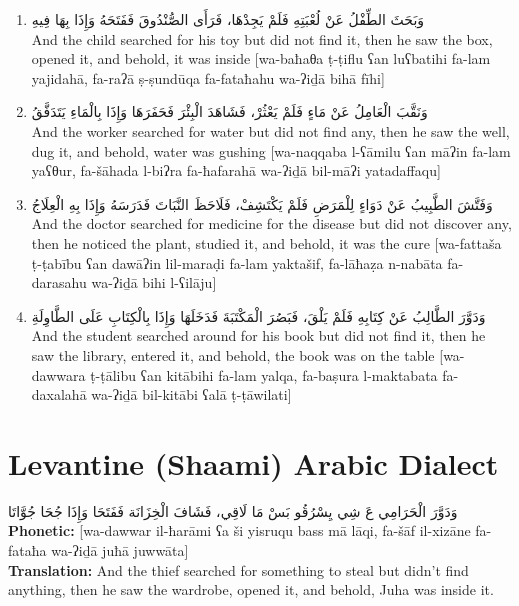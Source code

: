 \documentclass[letter,12pt]{article}
\begin{document}
\begin{enumerate}
\item \textarabic{وَبَحَثَ الطِّفْلُ عَنْ لُعْبَتِهِ فَلَمْ يَجِدْهَا، فَرَأَى الصُّنْدُوقَ فَفَتَحَهُ وَإِذَا بِهَا فِيهِ}\\
And the child searched for his toy but did not find it, then he saw the box, opened it, and behold, it was inside [wa-baħaθa ṭ-ṭiflu ʕan luʕbatihi fa-lam yajidahā, fa-raʔā ṣ-ṣundūqa fa-fataħahu wa-ʔiḏā bihā fīhi]

\item \textarabic{وَنَقَّبَ الْعَامِلُ عَنْ مَاءٍ فَلَمْ يَعْثُرْ، فَشَاهَدَ الْبِئْرَ فَحَفَرَهَا وَإِذَا بِالْمَاءِ يَتَدَفَّقُ}\\
And the worker searched for water but did not find any, then he saw the well, dug it, and behold, water was gushing [wa-naqqaba l-ʕāmilu ʕan māʔin fa-lam yaʕθur, fa-šāhada l-biʔra fa-ħafarahā wa-ʔiḏā bil-māʔi yatadaffaqu]

\item \textarabic{وَفَتَّشَ الطَّبِيبُ عَنْ دَوَاءٍ لِلْمَرَضِ فَلَمْ يَكْتَشِفْ، فَلَاحَظَ النَّبَاتَ فَدَرَسَهُ وَإِذَا بِهِ الْعِلَاجُ}\\
And the doctor searched for medicine for the disease but did not discover any, then he noticed the plant, studied it, and behold, it was the cure [wa-fattaša ṭ-ṭabību ʕan dawāʔin lil-maraḍi fa-lam yaktašif, fa-lāħaẓa n-nabāta fa-darasahu wa-ʔiḏā bihi l-ʕilāju]

\item \textarabic{وَدَوَّرَ الطَّالِبُ عَنْ كِتَابِهِ فَلَمْ يَلْقَ، فَبَصُرَ الْمَكْتَبَةَ فَدَخَلَهَا وَإِذَا بِالْكِتَابِ عَلَى الطَّاوِلَةِ}\\
And the student searched around for his book but did not find it, then he saw the library, entered it, and behold, the book was on the table [wa-dawwara ṭ-ṭālibu ʕan kitābihi fa-lam yalqa, fa-baṣura l-maktabata fa-daxalahā wa-ʔiḏā bil-kitābi ʕalā ṭ-ṭāwilati]
\end{enumerate}

\section{Levantine (Shaami) Arabic Dialect}

\begin{tcolorbox}[colback=white,colframe=dialectcolor,title=\textbf{Levantine Version},breakable]
\textarabic{وَدَوَّرَ الْحَرَامِي عَ شِي يِسْرُقُو بَسْ مَا لَاقِي، فَشَافَ الْخِزَانَة فَفَتَحَا وَإِذَا جُحَا جُوَّاتَا}\\
\textbf{Phonetic:} [wa-dawwar il-ħarāmi ʕa ši yisruqu bass mā lāqi, fa-šāf il-xizāne fa-fataħa wa-ʔiḏā juħā juwwāta]\\
\textbf{Translation:} And the thief searched for something to steal but didn't find anything, then he saw the wardrobe, opened it, and behold, Juha was inside it.
\end{tcolorbox}
\end{document}
